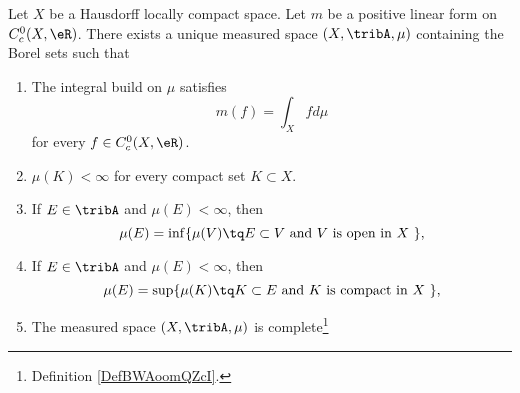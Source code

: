 \begin{theorem}      \label{THOooTWZWooHqGDAx}
	Let \( X\) be a Hausdorff locally compact space. Let \( m\) be a positive linear form on \( C^0_c(X, \eR)\). There exists a unique measured space \( (X,\tribA, \mu)\)  containing the Borel sets such that
	\begin{enumerate}
		\item       \label{ITEMooAKLQooWLetDk}
		      The integral build on \( \mu\) satisfies
		      \begin{equation}
			      m(f)=\int_X fd\mu
		      \end{equation}
		      for every \( f\in C^0_c(X,\eR)\).
		\item       \label{ITEMooFLYHooTNUENu}
		      \( \mu(K)<\infty\) for every compact set \( K\subset X\).
		\item       \label{ITEMooKDTLooJuUTaW}
		      If \( E\in\tribA\) and \( \mu(E)<\infty\), then
		      \begin{equation}
			      \mu(E)=\inf\{ \mu(V)\tq E\subset V \text{ and \( V\) is open in \( X\) }\},
		      \end{equation}
		\item       \label{ITEMooVKDEooXGJYgg}
		      If \( E\in\tribA\) and \( \mu(E)<\infty\), then
		      \begin{equation}
			      \mu(E)=\sup\{ \mu(K)\tq K\subset E \text{ and \( K\) is compact in \( X\) }\},
		      \end{equation}
		\item       \label{ITEMooLOQQooFcHyaM}
		      The measured space \( (X,\tribA,\mu)\) is complete\footnote{Definition \ref{DefBWAoomQZcI}.}
	\end{enumerate}
\end{theorem}

